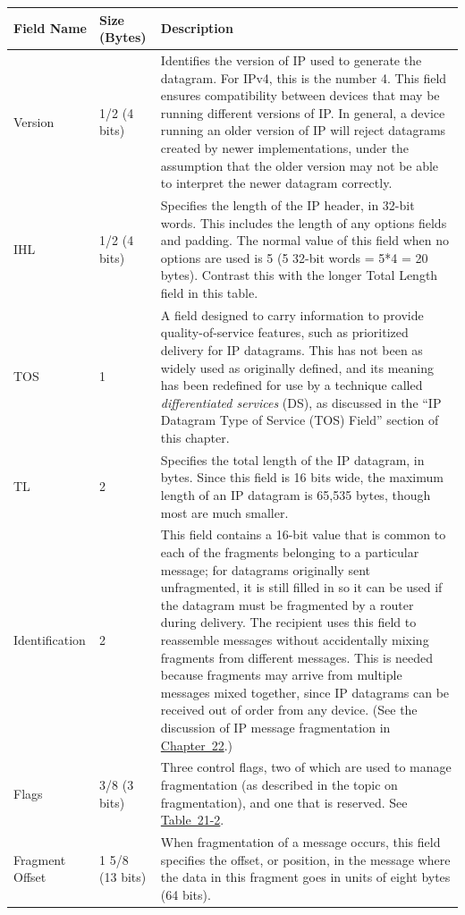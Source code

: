 \begin{longtable}[]{@{}lll@{}}
\toprule
Field Name & Size (Bytes) & Description\tabularnewline
\midrule
\endhead
Version & 1/2 (4 bits) & Identifies the version of IP used to generate
the datagram. For IPv4, this is the number 4. This field ensures
compatibility between devices that may be running different versions of
IP. In general, a device running an older version of IP will reject
datagrams created by newer implementations, under the assumption that
the older version may not be able to interpret the newer datagram
correctly.\tabularnewline
IHL & 1/2 (4 bits) & Specifies the length of the IP header, in 32-bit
words. This includes the length of any options fields and padding. The
normal value of this field when no options are used is 5 (5 32-bit words
= 5*4 = 20 bytes). Contrast this with the longer Total Length field in
this table.\tabularnewline
TOS & 1 & A field designed to carry information to provide
quality-of-service features, such as prioritized delivery for IP
datagrams. This has not been as widely used as originally defined, and
its meaning has been redefined for use by a technique called
\emph{differentiated services} (DS), as discussed in the ``IP Datagram
Type of Service (TOS) Field'' section of this chapter.\tabularnewline
TL & 2 & Specifies the total length of the IP datagram, in bytes. Since
this field is 16 bits wide, the maximum length of an IP datagram is
65,535 bytes, though most are much smaller.\tabularnewline
Identification & 2 & This field contains a 16-bit value that is common
to each of the fragments belonging to a particular message; for
datagrams originally sent unfragmented, it is still filled in so it can
be used if the datagram must be fragmented by a router during delivery.
The recipient uses this field to reassemble messages without
accidentally mixing fragments from different messages. This is needed
because fragments may arrive from multiple messages mixed together,
since IP datagrams can be received out of order from any device. (See
the discussion of IP message fragmentation in
\protect\hyperlink{ch22.html}{Chapter~22}.)\tabularnewline
Flags & 3/8 (3 bits) & Three control flags, two of which are used to
manage fragmentation (as described in the topic on fragmentation), and
one that is reserved. See
\protect\hyperlink{ch21s02.htmlux5cux23ipv_flags_subfields}{Table~21-2}.\tabularnewline
Fragment Offset & 1 5/8 (13 bits) & When fragmentation of a message
occurs, this field specifies the offset, or position, in the message
where the data in this fragment goes in units of eight bytes (64 bits).

\end{longtable}
